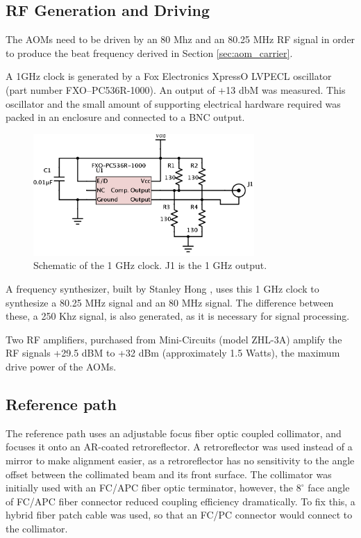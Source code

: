 \subsection{RF Generation and Driving}

The AOMs need to be driven by an 80 Mhz and an 80.25 MHz RF signal in order to produce the beat frequency derived in Section \ref{sec:aom_carrier}.

A 1GHz clock is generated by a Fox Electronics XpressO LVPECL oscillator (part number FXO–PC536R-1000). An output of +13 dbM was measured. This oscillator and the small amount of supporting electrical hardware required was packed in an enclosure and connected to a BNC output.

\begin{figure}[h!]
\centering
\includegraphics[width=0.75\textwidth]{Images/Schematics/1ghzclock_2.png}
\caption{Schematic of the 1 GHz clock. J1 is the 1 GHz output.}
\end{figure}

A frequency synthesizer, built by Stanley Hong \cite{hong}, uses this 1 GHz clock to synthesize a 80.25 MHz signal and an 80 MHz signal. The difference between these, a 250 Khz signal, is also generated, as it is necessary for signal processing.

Two RF amplifiers, purchased from Mini-Circuits (model ZHL-3A) amplify the RF signals +29.5 dBM to +32 dBm (approximately 1.5 Watts), the maximum drive power of the AOMs.

\subsection{Reference path}


The reference path uses an adjustable focus fiber optic coupled collimator, and focuses it onto an AR-coated retroreflector. A retroreflector was used instead of a mirror to make alignment easier, as a retroreflector has no sensitivity to the angle offset between the collimated beam and its front surface. The collimator was initially used with an FC/APC fiber optic terminator, however, the $8^{\circ}$ face angle of FC/APC fiber connector reduced coupling efficiency dramatically. To fix this, a hybrid fiber patch cable was used, so that an FC/PC connector would connect to the collimator.

